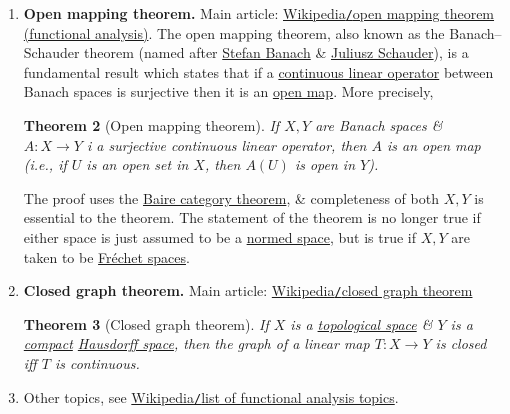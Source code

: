 \documentclass{article}
\newtheorem{theorem}{Theorem}
\begin{document}
\begin{enumerate}
	\begin{theorem}[Hahn--Banach theorem]
		If $p:V\to\mathbb{R}$ is a \href{https://en.wikipedia.org/wiki/Sublinear_function}{sublinear function}, \& $\varphi:U\to\mathbb{R}$ is a \href{https://en.wikipedia.org/wiki/Linear_functional}{linear functional} on a \href{https://en.wikipedia.org/wiki/Linear_subspace}{linear subspace} $U\subseteq V$ which is dominated by $p$ on $U$, i.e., $\varphi(x)\le p(x)$, $\forall x\in U$, then there exists a linear extension $\psi:V\to\mathbb{R}$ of $\varphi$ to the whole space $V$ which is dominated by $p$ on $V$, i.e., there exists a linear functional $\psi$ s.t. $\psi(x) = \varphi(x)$, $\forall x\in U$, $\psi(x)\le p(x)$, $\forall x\in V$.
	\end{theorem}
	\item {\bf Open mapping theorem.} Main article: \href{https://en.wikipedia.org/wiki/Open_mapping_theorem_(functional_analysis)}{Wikipedia{\tt/}open mapping theorem (functional analysis)}. The open mapping theorem, also known as the Banach--Schauder theorem (named after \href{https://en.wikipedia.org/wiki/Stefan_Banach}{\sc Stefan Banach} \& \href{https://en.wikipedia.org/wiki/Juliusz_Schauder}{\sc Juliusz Schauder}), is a fundamental result which states that if a \href{https://en.wikipedia.org/wiki/Bounded_linear_operator}{continuous linear operator} between Banach spaces is surjective then it is an \href{https://en.wikipedia.org/wiki/Open_map}{open map}. More precisely,
	
	\begin{theorem}[Open mapping theorem]
		If $X,Y$ are Banach spaces \& $A:X\to Y$ i a surjective continuous linear operator, then $A$ is an open map (i.e., if $U$ is an open set in $X$, then $A(U)$ is open in $Y$).
	\end{theorem}
	The proof uses the \href{https://en.wikipedia.org/wiki/Baire_category_theorem}{Baire category theorem}, \& completeness of both $X,Y$ is essential to the theorem. The statement of the theorem is no longer true if either space is just assumed to be a \href{https://en.wikipedia.org/wiki/Normed_space}{normed space}, but is true if $X,Y$ are taken to be \href{https://en.wikipedia.org/wiki/Fr%C3%A9chet_space}{Fr\'echet spaces}.
	\item {\bf Closed graph theorem.} Main article: \href{https://en.wikipedia.org/wiki/Closed_graph_theorem}{Wikipedia{\tt/}closed graph theorem}
	
	\begin{theorem}[Closed graph theorem]
		If $X$ is a \href{https://en.wikipedia.org/wiki/Topological_space}{topological space} \& $Y$ is a \href{https://en.wikipedia.org/wiki/Compact_space}{compact} \href{https://en.wikipedia.org/wiki/Hausdorff_space}{Hausdorff space}, then the graph of a linear map $T:X\to Y$ is closed iff $T$ is continuous.
	\end{theorem}
	\item Other topics, see \href{https://en.wikipedia.org/wiki/List_of_functional_analysis_topics}{Wikipedia{\tt/}list of functional analysis topics}.
\end{enumerate}
\end{document}
